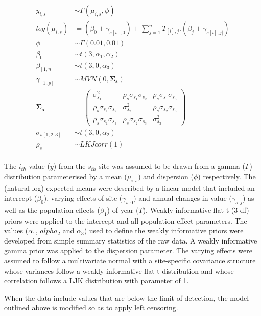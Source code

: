 \documentclass[
  8pt,
  a4paper]{article}
\begin{document}
\[
\begin{aligned}
y_{i,s} &\sim{} \Gamma(\mu_{i,s}, \phi)\\
log(\mu_{i,s}) &= (\beta_0 + \gamma_{s[i],0}) + \sum_{j=1}^nT_{[i],j}.(\beta_j + \gamma_{s[i],j]})\\
\phi&\sim\Gamma(0.01, 0.01)\\
\beta_0&\sim{}\mathit{t}(3, \alpha_1, \alpha_2)\\
\beta_{[1,n]}&\sim{}\mathit{t}(3, 0, \alpha_3)\\
\gamma_{[1..p]}&\sim{}MVN(0, \boldsymbol{\Sigma_s})\\
\boldsymbol{\Sigma_s} &=
{\begin{pmatrix}
\sigma_{s_1}^2 & \rho_s \sigma_{s_1} \sigma_{s_2} & \rho_s \sigma_{s_1} \sigma_{s_3}\\
\rho_s \sigma_{s_1} \sigma_{s_2} & \sigma_{s_2}^2 & \rho_s \sigma_{s_2} \sigma_{s_3}\\
\rho_s \sigma_{s_1} \sigma_{s_3}  & \rho_s \sigma_{s_2} \sigma_{s_3} & \sigma_{s_3}^2
\end{pmatrix}}\\
\sigma_{s[1,2,3]} &\sim \mathit{t}(3, 0, \alpha_2)\\
\rho_s &\sim \mathit{LKJcorr}(1)\\
\end{aligned}
\]

The \(i_{th}\) value (\(y\)) from the \(s_{th}\) site was assumed to be
drawn from a gamma (\(\Gamma\)) distribution parameterised by a mean
(\(\mu_{i,s}\)) and dispersion (\(\phi\)) respectively. The (natural
log) expected means were described by a linear model that included an
intercept (\(\beta_0\)), varying effects of site (\(\gamma_{s,0}\)) and
annual changes in value (\(\gamma_{s,j}\)) as well as the population
effects (\(\beta_1\)) of year (\(T\)). Weakly informative flat-t (3 df)
priors were applied to the intercept and all population effect
parameters. The values (\(\alpha_1\), \(alpha_2\) and \(\alpha_3\)) used
to define the weakly informative priors were developed from simple
summary statistics of the raw data. A weakly informative gamma prior was
applied to the dispersion parameter. The varying effects were assumed to
follow a multivariate normal with a site-specific covariance structure
whose variances follow a weakly informative flat t distribution and
whose correlation follows a LJK distribution with parameter of 1.

When the data include values that are below the limit of detection, the
model outlined above is modified so as to apply left censoring.
\end{document}
